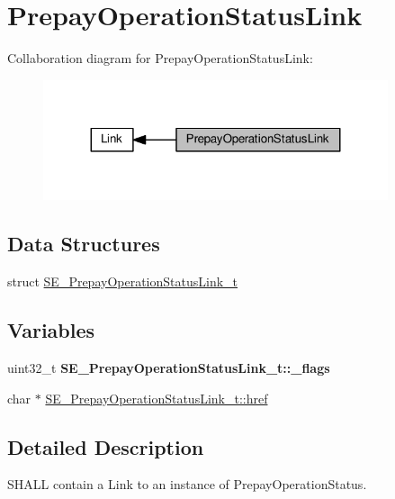 \hypertarget{group__PrepayOperationStatusLink}{}\section{Prepay\+Operation\+Status\+Link}
\label{group__PrepayOperationStatusLink}
Collaboration diagram for Prepay\+Operation\+Status\+Link\+:\nopagebreak
\begin{figure}[H]
\begin{center}
\leavevmode
\includegraphics[width=287pt]{group__PrepayOperationStatusLink}
\end{center}
\end{figure}
\subsection*{Data Structures}
\begin{DoxyCompactItemize}
\item 
struct \hyperlink{structSE__PrepayOperationStatusLink__t}{S\+E\+\_\+\+Prepay\+Operation\+Status\+Link\+\_\+t}
\end{DoxyCompactItemize}
\subsection*{Variables}
\begin{DoxyCompactItemize}
\item 
\mbox{\label{group__PrepayOperationStatusLink_ga1267b07259430429359680d054ae628e}} 
uint32\+\_\+t {\bfseries S\+E\+\_\+\+Prepay\+Operation\+Status\+Link\+\_\+t\+::\+\_\+flags}
\item 
char $\ast$ \hyperlink{group__PrepayOperationStatusLink_ga1945ecb56144d5d0b8db86b56dc485e8}{S\+E\+\_\+\+Prepay\+Operation\+Status\+Link\+\_\+t\+::href}
\end{DoxyCompactItemize}


\subsection{Detailed Description}
S\+H\+A\+LL contain a Link to an instance of Prepay\+Operation\+Status. 

